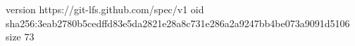 version https://git-lfs.github.com/spec/v1
oid sha256:3eab2780b5cedffd83e5da2821e28a8c731e286a2a9247bb4be073a9091d5106
size 73
